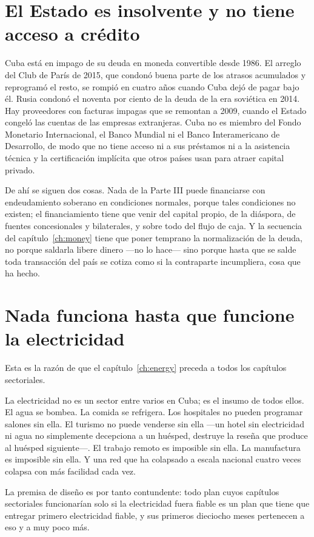 \section{El Estado es insolvente y no tiene acceso a crédito}

Cuba está en impago de su deuda en moneda convertible desde 1986. El arreglo del
Club de París de 2015, que condonó buena parte de los atrasos acumulados y
reprogramó el resto, se rompió en cuatro años cuando Cuba dejó de pagar bajo él.
Rusia condonó el noventa por ciento de la deuda de la era soviética en 2014. Hay
proveedores con facturas impagas que se remontan a 2009, cuando el Estado congeló
las cuentas de las empresas extranjeras. Cuba no es miembro del Fondo Monetario
Internacional, el Banco Mundial ni el Banco Interamericano de Desarrollo, de modo
que no tiene acceso ni a sus préstamos ni a la asistencia técnica y la
certificación implícita que otros países usan para atraer capital privado.

De ahí se siguen dos cosas. Nada de la Parte III puede financiarse con
endeudamiento soberano en condiciones normales, porque tales condiciones no
existen; el financiamiento tiene que venir del capital propio, de la diáspora, de
fuentes concesionales y bilaterales, y sobre todo del flujo de caja. Y la secuencia
del capítulo~\ref{ch:money} tiene que poner temprano la normalización de la deuda,
no porque saldarla libere dinero ---no lo hace--- sino porque hasta que se salde
toda transacción del país se cotiza como si la contraparte incumpliera, cosa que ha
hecho.

\section{Nada funciona hasta que funcione la electricidad}

Esta es la razón de que el capítulo~\ref{ch:energy} preceda a todos los capítulos
sectoriales.

La electricidad no es un sector entre varios en Cuba; es el insumo de todos ellos.
El agua se bombea. La comida se refrigera. Los hospitales no pueden programar
salones sin ella. El turismo no puede venderse sin ella ---un hotel sin
electricidad ni agua no simplemente decepciona a un huésped, destruye la reseña que
produce al huésped siguiente---. El trabajo remoto es imposible sin ella. La
manufactura es imposible sin ella. Y una red que ha colapsado a escala nacional
cuatro veces colapsa con más facilidad cada vez.

La premisa de diseño es por tanto contundente: todo plan cuyos capítulos
sectoriales funcionarían solo si la electricidad fuera fiable es un plan que tiene
que entregar primero electricidad fiable, y sus primeros dieciocho meses pertenecen
a eso y a muy poco más.

